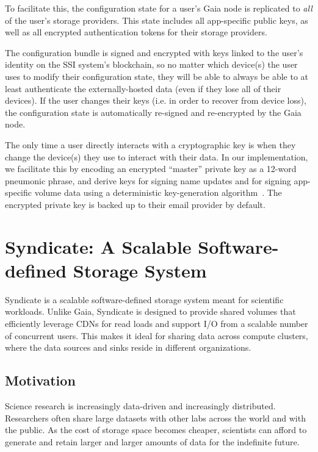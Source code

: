 To facilitate this, the configuration state for a user's Gaia node is replicated to \textit{all} of
the user's storage providers.  This state includes all app-specific public keys,
as well as all encrypted authentication tokens for their storage providers.

The configuration bundle is signed and encrypted with keys linked to
the user's identity on the SSI system's blockchain, so no matter which device(s) the user
uses to modify their configuration state, they will be able to always be able to
at least authenticate the externally-hosted data (even if they lose all of their
devices).  If the user changes their keys (i.e. in order to recover from device
loss), the configuration state is
automatically re-signed and re-encrypted by the Gaia node.

The only time a user directly interacts with a cryptographic key is when they
change the device(s) they use to interact with their data.
In our implementation, we facilitate this by
encoding an encrypted ``master'' private key as a 12-word pneumonic phrase, and derive keys
for signing name updates and for signing app-specific volume data
using a deterministic key-generation
algorithm~\cite{bip39}.  The encrypted private key is backed up to their email provider by
default.

\section{Syndicate: A Scalable Software-defined Storage System}

Syndicate is a scalable software-defined storage system meant for scientific
workloads.  Unlike Gaia, Syndicate is designed to provide shared volumes that
efficiently leverage CDNs for read loads and 
support I/O from a scalable number of concurrent users.  This makes
it ideal for sharing data across compute clusters, where the data sources and
sinks reside in different organizations.

\subsection{Motivation}

Science research is increasingly data-driven and increasingly distributed.
Researchers often share large datasets with other labs across the world and 
with the public.  As the cost of storage space becomes cheaper, scientists can
afford to generate and retain larger and larger amounts of data for the
indefinite future.

